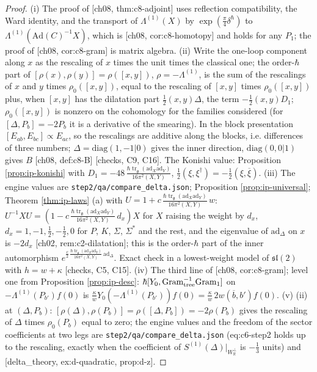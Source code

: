 \documentclass[11pt]{report}
\theoremstyle{plain}
\theoremstyle{definition}
\numberwithin{equation}{chapter}
\newcommand{\unit}{\tfrac{\hbar\operatorname{tr}_{\mathfrak g}(\mathrm{ad}_X\mathrm{ad}_Y)}{16\pi^2(X,Y)}}
\newcommand{\Wp}{W_{\mathbb R}^\perp}
\newcommand{\Gt}{\mathrm{Gram}_{\rm tree}}
\newcommand{\Go}{\mathrm{Gram}_{1}}
\begin{document}
\begin{proof}
(i) The proof of [ch08, thm:c8-adjoint] uses reflection compatibility, the Ward identity, and the transport of $\Lambda^{(1)}(X)$ by $\exp(\tfrac\pi4\delta^\hbar)$ to $\Lambda^{(1)}(\mathrm{Ad}(C)^{-1}X)$, which is [ch08, cor:c8-homotopy] and holds for any $P_1$; the proof of [ch08, cor:c8-gram] is matrix algebra. (ii) Write the one-loop component along $x$ as the rescaling of $x$ times the unit times the classical one; the order-$\hbar$ part of $[\rho(x),\rho(y)]=\rho([x,y])$, $\rho=-\Lambda^{(1)}$, is the sum of the rescalings of $x$ and $y$ times $\rho_0([x,y])$, equal to the rescaling of $[x,y]$ times $\rho_0([x,y])$ plus, when $[x,y]$ has the dilatation part $\tfrac12(x,y)\Delta$, the term $-\tfrac12(x,y)D_1$; $\rho_0([x,y])$ is nonzero on the cohomology for the families considered (for $[\Delta,P_b]=-2P_b$ it is a derivative of the smearing). In the block presentation $[E_{ab},E_{bc}]\propto E_{ac}$, so the rescalings are additive along the blocks, i.e. differences of three numbers; $\Delta=\mathrm{diag}(1,-1|0)$ gives the inner direction, $\mathrm{diag}(0,0|1)$ gives $B$ [ch08, def:c8-B] [checks, C9, C16]. The Konishi value: Proposition \ref{prop:ip-konishi} with $D_1=-48\,\unit$, $\tfrac12(\xi,\xi^\dagger)=-\tfrac12(\xi,\overline\xi)$. (iii) The engine values are \texttt{step2/qa/compare\_delta.json}; Proposition \ref{prop:ip-universal}; Theorem \ref{thm:ip-laws} (a) with $U=1+c\,\unit\,w$: $U^{-1}XU=(1-c\,\unit\,d_x)X$ for $X$ raising the weight by $d_x$, $d_x=1,-1,\tfrac12,-\tfrac12,0$ for $P$, $K$, $\Sigma$, $\Sigma^*$ and the rest, and the eigenvalue of $\mathrm{ad}_\Delta$ on $x$ is $-2d_x$ [ch02, rem:c2-dilatation]; this is the order-$\hbar$ part of the inner automorphism $e^{\frac c2\,\unit\,\mathrm{ad}_\Delta}$. Exact check in a lowest-weight model of $\mathfrak{sl}(2)$ with $h=w+\kappa$ [checks, C5, C15]. (iv) The third line of [ch08, cor:c8-gram]; level one from Proposition \ref{prop:ip-desc}: $\hbar[Y_0,\Gt^{-1}\Go]$ on $-\Lambda^{(1)}(P_{b'})f(0)$ is $\tfrac{\kappa}{w}Y_0(-\Lambda^{(1)}(P_{b'}))f(0)=\tfrac\kappa w\,2w(\overline b,b')f(0)$. (v) (ii) at $(\Delta,P_b)$: $[\rho(\Delta),\rho(P_b)]=\rho([\Delta,P_b])=-2\rho(P_b)$ gives the rescaling of $\Delta$ times $\rho_0(P_b)$ equal to zero; the engine values and the freedom of the sector coefficients at two legs are \texttt{step2/qa/compare\_delta.json} (eq:c6-step2 holds up to the rescaling, exactly when the coefficient of $S^{(1)}(\Delta)|_{\Wp}$ is $-\tfrac13$ units) and [delta\_theory, ex:d-quadratic, prop:d-z].
\end{proof}
\end{document}
